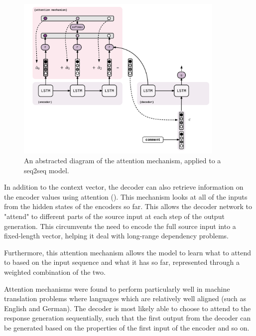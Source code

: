 \documentclass[12pt,twoside]{report}
\begin{document}
\begin{figure}[!ht]
      
	\centering
	\includegraphics[width=100mm]{diagrams/seq2seq_attention_mechanism.pdf}
	\caption{An abstracted diagram of the attention mechanism, applied to a seq2seq model.\label{seq2seq_attn}}
\end{figure}

In addition to the context vector, the decoder can also retrieve information on the encoder values using attention (\cite{bahdanau_neural_2014}). This mechanism looks at all of the inputs from the hidden states of the encoders so far. This allows the decoder network to "attend" to different parts of the source input at each step of the output generation. This circumvents the need to encode the full source input into a fixed-length vector, helping it deal with long-range dependency problems.

Furthermore, this attention mechanism allows the model to learn what to attend to based on the input sequence and what it has so far, represented through a weighted combination of the two.

Attention mechanisms were found to perform particularly well in machine translation problems where languages which are relatively well aligned (such as English and German). The decoder is most likely able to choose to attend to the response generation sequentially, such that the first output from the decoder can be generated based on the properties of the first input of the encoder and so on.

\end{document}
